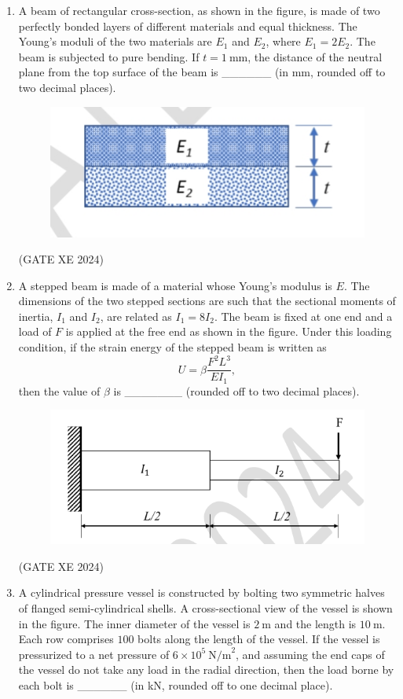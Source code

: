 \documentclass[12pt]{article}
\begin{document}
\begin{enumerate}
\item A beam of rectangular cross-section, as shown in the figure, is made of two perfectly bonded layers of different materials and equal thickness. The Young’s moduli of the two materials are $E_1$ and $E_2$, where $E_1 = 2E_2$. The beam is subjected to pure bending. If $t=1\ \text{mm}$, the distance of the neutral plane from the top surface of the beam is \_\_\_\_\_\_ (in mm, rounded off to two decimal places).

\begin{figure}[H]
    \centering
    \includegraphics[width=0.5\columnwidth]{figs/ass5_d_q82.jpg}
    \caption{}
    \label{fig:placeholder}
\end{figure}

(GATE XE 2024)

\item A stepped beam is made of a material whose Young’s modulus is $E$. The dimensions of the two stepped sections are such that the sectional moments of inertia, $I_1$ and $I_2$, are related as $I_1 = 8 I_2$. The beam is fixed at one end and a load of $F$ is applied at the free end as shown in the figure. Under this loading condition, if the strain energy of the stepped beam is written as 
$$U = \beta \frac{F^2 L^3}{E I_1},$$
then the value of $\beta$ is \_\_\_\_\_\_\_ (rounded off to two decimal places).

\begin{figure}[H]
    \centering
    \includegraphics[width=0.5\columnwidth]{figs/ass5_d_q83.png}
    \caption{}
    \label{fig:placeholder}
\end{figure}

(GATE XE 2024)

\item A cylindrical pressure vessel is constructed by bolting two symmetric halves of flanged semi-cylindrical shells. A cross-sectional view of the vessel is shown in the figure. The inner diameter of the vessel is $2\ \text{m}$ and the length is $10\ \text{m}$. Each row comprises $100$ bolts along the length of the vessel. If the vessel is pressurized to a net pressure of $6 \times 10^5\ \text{N/m}^2$, and assuming the end caps of the vessel do not take any load in the radial direction, then the load borne by each bolt is \_\_\_\_\_\_ (in kN, rounded off to one decimal place).


\end{enumerate}
\end{document}
